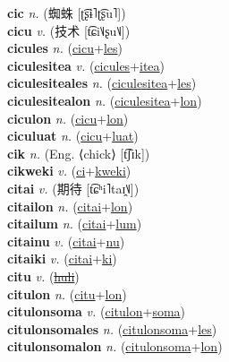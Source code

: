 \textbf{cic} \textit{n.} ({\chinese{}蜘蛛} [ʈ͡ʂɨ˥ʈ͡ʂu˥])
 \label{cic} \\
\textbf{cicu} \textit{v.} ({\chinese{}技术} [t͡ɕi˥˩ʂu˥˩])
 \label{cicu} \\
\textbf{cicules} \textit{n.} (\hyperref[cicu]{cicu}+\hyperref[les]{les})
 \label{cicules} \\
\textbf{ciculesitea} \textit{v.} (\hyperref[cicules]{cicules}+\hyperref[itea]{itea})
 \label{ciculesitea} \\
\textbf{ciculesiteales} \textit{n.} (\hyperref[ciculesitea]{ciculesitea}+\hyperref[les]{les})
 \label{ciculesiteales} \\
\textbf{ciculesitealon} \textit{n.} (\hyperref[ciculesitea]{ciculesitea}+\hyperref[lon]{lon})
 \label{ciculesitealon} \\
\textbf{ciculon} \textit{n.} (\hyperref[cicu]{cicu}+\hyperref[lon]{lon})
 \label{ciculon} \\
\textbf{ciculuat} \textit{n.} (\hyperref[cicu]{cicu}+\hyperref[luat]{luat})
 \label{ciculuat} \\
\textbf{cik} \textit{n.} (Eng. ⟨chick⟩ [t͡ʃɪk])
 \label{cik} \\
\textbf{cikweki} \textit{v.} (\hyperref[ci]{ci}+\hyperref[kweki]{kweki})
 \label{cikweki} \\
\textbf{citai} \textit{v.} ({\chinese{}期待} [t͡ɕʰi˥taɪ̯˥˩])
 \label{citai} \\
\textbf{citailon} \textit{n.} (\hyperref[citai]{citai}+\hyperref[lon]{lon})
 \label{citailon} \\
\textbf{citailum} \textit{n.} (\hyperref[citai]{citai}+\hyperref[lum]{lum})
 \label{citailum} \\
\textbf{citainu} \textit{v.} (\hyperref[citai]{citai}+\hyperref[nu]{nu})
 \label{citainu} \\
\textbf{citaiki} \textit{v.} (\hyperref[citai]{citai}+\hyperref[ki]{ki})
 \label{citaiki} \\
\textbf{citu} \textit{v.} (\hyperref[huli]{\sout{huli}})
 \label{citu} \\
\textbf{citulon} \textit{n.} (\hyperref[citu]{citu}+\hyperref[lon]{lon})
 \label{citulon} \\
\textbf{citulonsoma} \textit{v.} (\hyperref[citulon]{citulon}+\hyperref[soma]{soma})
 \label{citulonsoma} \\
\textbf{citulonsomales} \textit{n.} (\hyperref[citulonsoma]{citulonsoma}+\hyperref[les]{les})
 \label{citulonsomales} \\
\textbf{citulonsomalon} \textit{n.} (\hyperref[citulonsoma]{citulonsoma}+\hyperref[lon]{lon})
